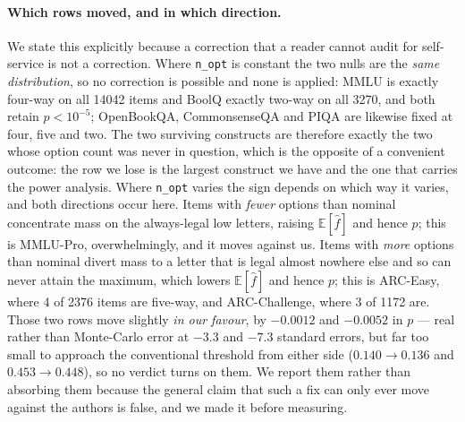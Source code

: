 \paragraph{Which rows moved, and in which direction.} We state this explicitly because a correction that a reader cannot audit for self-service is not a correction. Where \texttt{n\_opt} is constant the two nulls are the \emph{same distribution}, so no correction is possible and none is applied: MMLU is exactly four-way on all 14042 items and BoolQ exactly two-way on all 3270, and both retain $p<10^{-5}$; OpenBookQA, CommonsenseQA and PIQA are likewise fixed at four, five and two. The two surviving constructs are therefore exactly the two whose option count was never in question, which is the opposite of a convenient outcome: the row we lose is the largest construct we have and the one that carries the power analysis. Where \texttt{n\_opt} varies the sign depends on which way it varies, and both directions occur here. Items with \emph{fewer} options than nominal concentrate mass on the always-legal low letters, raising $\mathbb{E}[\hat f]$ and hence $p$; this is MMLU-Pro, overwhelmingly, and it moves against us. Items with \emph{more} options than nominal divert mass to a letter that is legal almost nowhere else and so can never attain the maximum, which lowers $\mathbb{E}[\hat f]$ and hence $p$; this is ARC-Easy, where 4 of 2376 items are five-way, and ARC-Challenge, where 3 of 1172 are. Those two rows move slightly \emph{in our favour}, by $-0.0012$ and $-0.0052$ in $p$ --- real rather than Monte-Carlo error at $-3.3$ and $-7.3$ standard errors, but far too small to approach the conventional threshold from either side ($0.140\rightarrow0.136$ and $0.453\rightarrow0.448$), so no verdict turns on them. We report them rather than absorbing them because the general claim that such a fix can only ever move against the authors is false, and we made it before measuring.

